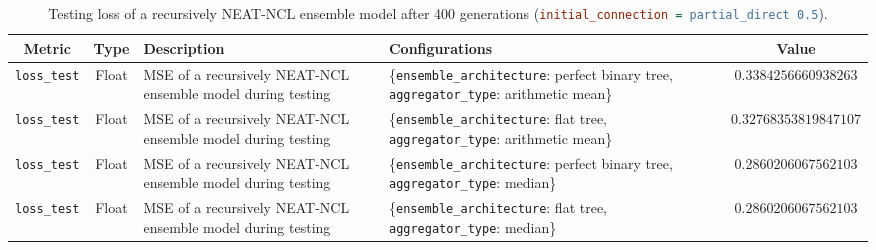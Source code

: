 \documentclass{article}
\begin{document}
\begin{table}[H]
    \centering
    \begin{tabular}{|c|c|p{4cm}|p{5cm}|c|}
        \hline
        Metric & Type & Description & Configurations & Value \\
        \hline
        \small\texttt{loss\_test} & Float & MSE of a recursively NEAT-NCL ensemble model during testing & \{\texttt{ensemble\_architecture}: perfect binary tree, \texttt{aggregator\_type}: arithmetic mean\} & $0.3384256660938263$ \\
        \hline
        \small\texttt{loss\_test} & Float & MSE of a recursively NEAT-NCL ensemble model during testing & \{\texttt{ensemble\_architecture}: flat tree, \texttt{aggregator\_type}: arithmetic mean\} & $0.32768353819847107$ \\
        \hline
        \small\texttt{loss\_test} & Float & MSE of a recursively NEAT-NCL ensemble model during testing & \{\texttt{ensemble\_architecture}: perfect binary tree, \texttt{aggregator\_type}: median\} & $0.2860206067562103$ \\
        \hline
        \small\texttt{loss\_test} & Float & MSE of a recursively NEAT-NCL ensemble model during testing & \{\texttt{ensemble\_architecture}: flat tree, \texttt{aggregator\_type}: median\} & $0.2860206067562103$ \\
        \hline
    \end{tabular}
    \caption{Testing loss of a recursively NEAT-NCL ensemble model after 400 generations (\lstinline[language=ini]|initial_connection = partial_direct 0.5|). }
    \label{table:experiment_6_neat_ncl_partial_direct}
\end{table}
\end{document}
